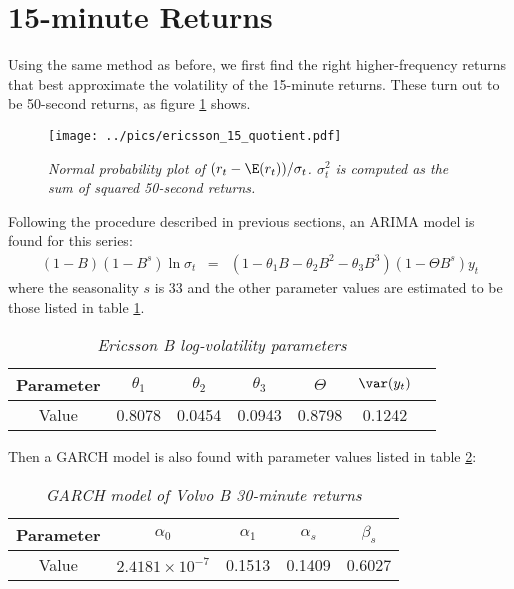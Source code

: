 \section{15-minute Returns}\label{sec:ericsson_15min}
Using the same method as before, we first find the right
higher-frequency returns that best approximate the volatility of the
15-minute returns. These turn out to be 50-second returns, as figure
\ref{fig:ericsson_15_quotient} shows.
\begin{figure}[htb!]
  \centering
  \texttt{[image: ../pics/ericsson\_15\_quotient.pdf]}
  \caption{\small \it Normal probability plot of $(r_t -\E(r_t))/
    \sigma_t$. $\sigma_t^2$ is computed as the sum of squared
    50-second returns.}
  \label{fig:ericsson_15_quotient}
\end{figure}

Following the procedure described in previous sections, an ARIMA model is
found for this series:
\begin{eqnarray*}
  (1-B)(1-B^s) \ln\sigma_t &=& (1- \theta_1B - \theta_2B^2 -
  \theta_3B^3)(1 - \Theta B^s) y_t
\end{eqnarray*}
where the seasonality $s$ is 33 and the other parameter values are
estimated to be those listed in table \ref{tab:ericsson_15_params}.
\begin{table}[htb!]
  \centering
  \begin{tabular}{|c|c|c|c|c|c|c|}
    \hline
    Parameter & $\theta_1$ & $\theta_2$ & $\theta_3$ & $\Theta$ &
    $\var(y_t)$ \\
    \hline
    Value & 0.8078 & 0.0454 & 0.0943 & 0.8798 & 0.1242 \\
    \hline
  \end{tabular}
  \caption{\small \it Ericsson B log-volatility parameters}
  \label{tab:ericsson_15_params}
\end{table}

Then a GARCH model is also found with parameter values listed in
table \ref{tab:ericsson_15_garch_params}:
\begin{table}[htb!]
  \centering
  \begin{tabular}{|c|c|c|c|c|}
    \hline
    Parameter & $\alpha_0$ & $\alpha_1$ & $\alpha_{s}$ & $\beta_{s}$ \\
    \hline
    Value & $2.4181 \times 10^{-7}$ & 0.1513 & 0.1409 & 0.6027 \\
    \hline
  \end{tabular}
  \caption{\small \it GARCH model of Volvo B 30-minute returns}
  \label{tab:ericsson_15_garch_params}
\end{table}

